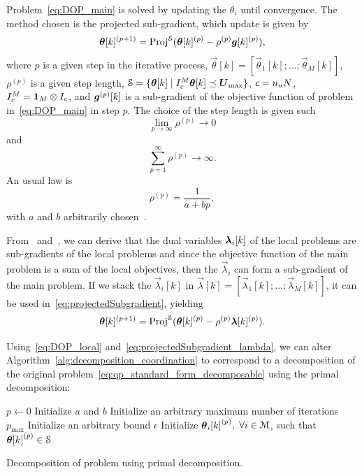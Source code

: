 \documentclass[../main.tex]{subfiles}
\begin{document}
Problem~\eqref{eq:DOP_main} is solved by updating the $\theta_{i}$ until convergence. The method chosen is the projected sub-gradient, which update is given by
\begin{equation}
  \label{eq:projectedSubgradient}
\boldsymbol{\theta}[k]^{(p+1)}=\operatorname{Proj}^{\mathcal{S}}(\boldsymbol{\theta}[k]^{(p)}-\rho^{(p)}\boldsymbol{g}[k]^{(p)}),
\end{equation}
where $p$ is a given step in the iterative process, $\vec{\theta}[k]=[\vec{\theta}_{1}[k];\dots;\vec{\theta}_{M}[k]]$,
$\rho^{(p)}$ is a given step length,
${\mathcal{S} = \{\boldsymbol{\theta}[k]\mid I_{c}^{M}\boldsymbol{\theta}[k]\preceq \boldsymbol{U}_{\max}\}}$,
${c=n_{u}N}$,
${I_{c}^{M}=\mathbf{1}_{M}\otimes I_{c}}$,
and
$\boldsymbol{g}^{(p)}[k]$ is a sub-gradient of the objective function of problem in~\eqref{eq:DOP_main} in step $p$.
The choice of the step length is given such
\[\lim_{p\to\infty}\rho^{(p)}\to0\]
and
\[\sum_{p=1}^{\infty}\rho^{(p)}\to\infty.\]
An usual law is
\[\rho^{(p)}=\frac{1}{a+bp},\]
with $a$ and $b$ arbitrarily chosen~\cite{ConejoEtAl2006}.

From~\cite{BoydVandenberghe2004} and~\cite{BoydEtAl2015}, we can derive that the dual variables $\lambdaik$ of the local problems are sub-gradients of the local problems and since the objective function of the main problem is a sum of the local objectives, then the $\vec{\lambda}_{i}$ can form a sub-gradient of the main problem.
If we stack the $\vec{\lambda}_{i}[k]$ in $\vec{\lambda}[k]=[\vec{\lambda}_{1}[k];\dots;\vec{\lambda}_{M}[k]]$, it can be used in~\eqref{eq:projectedSubgradient}, yielding
\begin{equation}
  \label{eq:projectedSubgradient_lambda}
\boldsymbol{\theta}[k]^{(p+1)}=\operatorname{Proj}^{\mathcal{S}}(\boldsymbol{\theta}[k]^{(p)}-\rho^{(p)}\boldsymbol{\lambda}[k]^{(p)}).
\end{equation}

Using~\eqref{eq:DOP_local} and~\eqref{eq:projectedSubgradient_lambda}, we can alter Algorithm~\ref{alg:decomposition_coordination} to correspond to a decomposition of the original \mpc{} problem~\eqref{eq:qp_standard_form_decomposable} using the primal decomposition:
\begin{algorithm2e}[h]
  \DontPrintSemicolon%
  $p\gets 0$\;
  Initialize $a$ and $b$\;
  Initialize an arbitrary maximum number of iterations $p_{\max}$\;
  Initialize an arbitrary bound $\epsilon$\;
  Initialize ${\thetaik}^{(p)},$ $\forall i\in\mathcal{M}$, such that ${\boldsymbol{\theta}[k]}^{(p)}\in\mathcal{S}$\;
  \caption{Decomposition of \mpc{} problem using primal decomposition.}\label{alg:primal_decomposition}
\end{algorithm2e}
\end{document}
